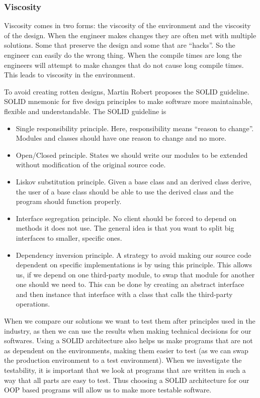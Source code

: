 \documentclass[12pt]{report}
\theoremstyle{definition}
\theoremstyle{theorem}
\begin{document}
\subsubsection*{Viscosity} 

Viscosity comes in two forms: the viscosity of the environment and the viscosity
of the design. When the engineer makes changes they are often met with multiple
solutions. Some that preserve the design and some that are ``hacks''. So the
engineer can easily do the wrong thing. When the compile times are long the
engineers will attempt to make changes that do not cause long compile times.
This leads to viscosity in the environment.

To avoid creating rotten designs, Martin Robert proposes the SOLID guideline.
SOLID mnemonic for five design principles to make software more maintainable,
flexible and understandable. The SOLID guideline is

\begin{itemize}
    \item Single responsibility principle. Here, responsibility means ``reason
        to change''. Modules and classes should have one reason to change and no
        more.
    \item Open/Closed principle. States we should write our modules to be
        extended without modification of the original source code.
    \item Liskov substitution principle. Given a base class and an derived
        class derive, the user of a base class should be able to use the derived
        class and the program should function properly.
    \item Interface segregation principle. No client should be forced to depend
        on methods it does not use. The general idea is that you want to split
        big interfaces to smaller, specific ones.
    \item Dependency inversion principle. A strategy to avoid making our source
        code dependent on specific implementations is by using this principle.
        This allows us, if we depend on one third-party module, to swap that
        module for another one should we need to. This can be done by creating
        an abstract interface and then instance that interface with a class that
        calls the third-party operations.~\cite{martinrobert}
\end{itemize}

When we compare our solutions we want to test them after principles used in the
industry, as then we can use the results when making technical decisions for our
softwares. Using a SOLID architecture also helps us make programs that are not
as dependent on the environments, making them easier to test (as we can swap the
production environment to a test environment). When we investigate the
testability, it is important that we look at programs that are written in such a
way that all parts are easy to test. Thus choosing a SOLID architecture for our
OOP based programs will allow us to make more testable software.
\end{document}
